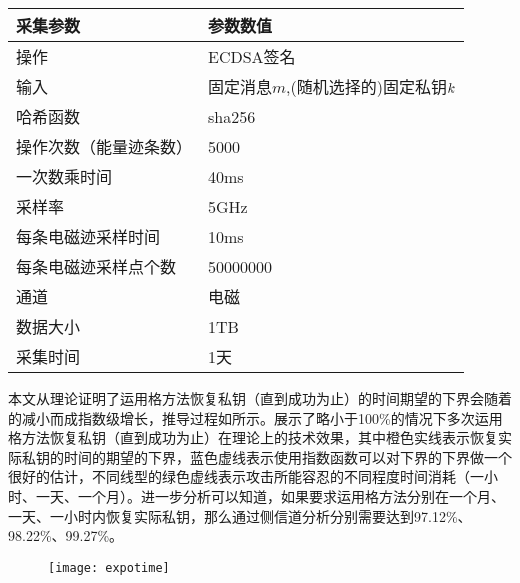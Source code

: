 {	
	
	\begin{table}[!h]
		\label{tab:acquisitionpara}
		\centering
		\begin{tabular}{ll}                                                               
			\hline   
			采集参数&参数数值\\                                                          
			\hline
			操作 & ECDSA签名\\
			输入 & 固定消息$m$,(随机选择的)固定私钥$k$\\
			哈希函数& sha256\citep{FIPS180-4}\\
			操作次数（能量迹条数） & 5000\\
			一次数乘时间 & 40ms\\
			采样率 & 5GHz\\
			每条电磁迹采样时间 & 10ms\\
			每条电磁迹采样点个数 & 50000000\\
			通道 & 电磁\\
			数据大小 & 1TB\\
			采集时间 & 1天\\
			\hline
		\end{tabular}
	\end{table}

	
	本文从理论证明了运用格方法恢复私钥（直到成功为止）的时间期望的下界会随着\zyx 的减小而成指数级增长，推导过程如所示。展示了\zyx 略小于100\%的情况下多次运用格方法恢复私钥（直到成功为止）在理论上的技术效果，其中橙色实线表示恢复实际私钥的时间的期望的下界，蓝色虚线表示使用指数函数可以对下界的下界做一个很好的估计，不同线型的绿色虚线表示攻击所能容忍的不同程度时间消耗（一小时、一天、一个月）。进一步分析可以知道，如果要求运用格方法分别在一个月、一天、一小时内恢复实际私钥，那么通过侧信道分析\zyx 分别需要达到97.12\%、98.22\%、99.27\%。
	
	\begin{figure}[!h]
		\begin{center}
			\texttt{[image: expotime]}
			\label{fig:expotime}
		\end{center}
	\end{figure}

}

